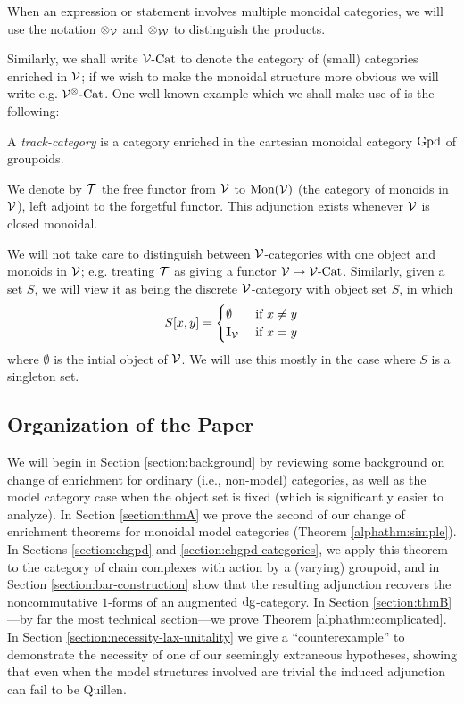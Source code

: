 \documentclass[12pt]{amsart}
\begin{document}
When an expression or statement involves multiple monoidal categories, we will use the notation $\otimes_\mathcal{V}$ and $\otimes_\mathcal{W}$ to distinguish the products.
\par
Similarly, we shall write $\mathcal{V}\text{-}\mathrm{Cat}$ to denote the category of (small) categories enriched in $\mathcal{V}$; if we wish to make the monoidal structure more obvious we will write e.g. $\mathcal{V}^\otimes\text{-}\mathrm{Cat}$.
One well-known example which we shall make use of is the following:
\begin{definition}
	A \emph{track-category} is a category enriched in the cartesian monoidal category $\mathrm{Gpd}$ of groupoids. 
\end{definition}
We denote by $\mathcal{T}$ the free functor from $\mathcal{V}$ to $\mathrm{Mon}(\mathcal{V})$ (the category of monoids in $\mathcal{V}$), left adjoint to the forgetful functor. This adjunction exists whenever $\mathcal{V}$ is closed monoidal.
\par 
We will not take care to distinguish between $\mathcal{V}$-categories with one object and monoids in $\mathcal{V}$; e.g. treating $\mathcal{T}$ as giving a functor $\mathcal{V} \to \mathcal{V}\text{-}\mathrm{Cat}$. 
Similarly, given a set $S$, we will view it as being the discrete $\mathcal{V}$-category with object set $S$, in which
$$
	S[x,y] = 
\begin{cases}
	\emptyset & \text{ if } x \neq y \\
	\mathbf{I}_\mathcal{V} & \text{ if } x = y
\end{cases}
$$
where $\emptyset$ is the intial object of $\mathcal{V}$. 
We will use this mostly in the case where $S$ is a singleton set. 
\subsection{Organization of the Paper}
	We will begin in Section \ref{section:background} by reviewing some background on change of enrichment for ordinary (i.e., non-model) categories, as well as the model category case when the object set is fixed (which is significantly easier to analyze).
	In Section \ref{section:thmA} we prove the second of our change of enrichment theorems for monoidal model categories (Theorem \ref{alphathm:simple}). 
	In Sections \ref{section:chgpd} and \ref{section:chgpd-categories}, 
	we apply this theorem to the category of chain complexes with action by a (varying) groupoid,
	and in Section \ref{section:bar-construction} show that the resulting adjunction recovers
	the noncommutative $1$-forms of an augmented $\mathrm{dg}$-category. 
	In Section \ref{section:thmB}---by far the most technical section---we prove Theorem \ref{alphathm:complicated}.
	In Section \ref{section:necessity-lax-unitality} we give a ``counterexample'' to demonstrate the necessity of one of our seemingly extraneous hypotheses, showing that even when the model structures involved are trivial the induced adjunction can fail to be Quillen.
\end{document}
